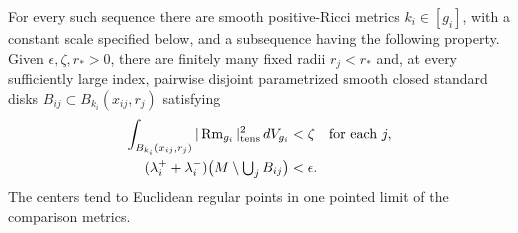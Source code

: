 \begin{theorem}
\label{thm:endpoint-disks}
For every such sequence there are smooth positive-Ricci metrics
\(k_i\in[g_i]\), with a constant scale specified below, and a
subsequence having the following property. Given \(\epsilon,\zeta,r_*>0\),
there are finitely many fixed radii \(r_j<r_*\) and, at every
sufficiently large index, pairwise disjoint parametrized smooth
closed standard disks \(B_{ij}\subset B_{k_i}(x_{ij},r_j)\) satisfying
\begin{align}
 \int_{B_{k_i}(x_{ij},r_j)} |\operatorname{Rm}_{g_i}|_{\rm tens}^2\,dV_{g_i}
 &<\zeta\quad\text{for each }j,\label{eq:endpoint-curv}\\
 (\lambda_i^++\lambda_i^-)
 \big(M\setminus\textstyle\bigcup_j B_{ij}\big)&<\epsilon .
 \label{eq:endpoint-capture}
\end{align}
The centers tend to Euclidean regular points in one pointed limit of
the comparison metrics.
\end{theorem}

